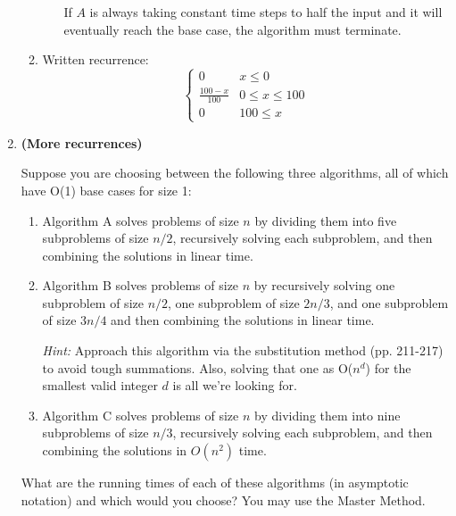 \documentclass[letterpaper,11pt]{article}
\begin{document}
\begin{enumerate}
\begin{enumerate}
\begin{itemize}
                If $A$ is always taking constant time steps to half the input
                and it will eventually reach the base case, the algorithm must 
                terminate. 
            \end{itemize}
        \item Written recurrence:
            \[ 
                \begin{cases}
                    0 & x\leq 0 \\
                    \frac{100-x}{100} & 0\leq x\leq 100 \\
                    0 & 100\leq x
                \end{cases}
            \]
    \end{enumerate}


    \newpage
    \item \textbf{(More recurrences)}
    
    Suppose you are choosing between the following three algorithms, all of which have O(1) base cases for size 1:
\begin{enumerate}
        \item Algorithm A solves problems of size $n$ by dividing them into five subproblems of size $n/2$, recursively solving each subproblem, and then combining the solutions in linear time.
        \item Algorithm B solves problems of size $n$ by recursively solving one subproblem of size $n/2$, one subproblem of size $2n/3$, and one subproblem of size $3n/4$ and then combining the solutions in linear time. 
        
        \emph{Hint:}  Approach this algorithm via the substitution method (pp. 211-217) to avoid tough summations.  
        Also, solving that one as O($n^d$) for the smallest valid integer $d$ is all we're looking for.
        \item Algorithm C solves problems of size $n$ by dividing them into nine subproblems of size $n/3$, recursively solving each subproblem, and then combining the solutions in $O(n^{2})$ time.
\end{enumerate}
What are the running times of each of these algorithms (in asymptotic notation) and which would you choose?  You may use the
Master Method.

\end{enumerate}
\end{document}
